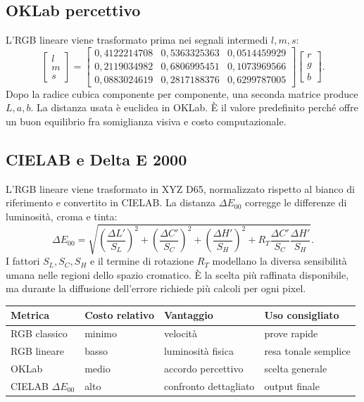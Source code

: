 \documentclass[11pt,a4paper]{article}
\begin{document}
\subsection{OKLab percettivo}
L'RGB lineare viene trasformato prima nei segnali intermedi $l,m,s$:
\[
\begin{bmatrix}l\\m\\s\end{bmatrix}=
\begin{bmatrix}
0{,}4122214708&0{,}5363325363&0{,}0514459929\\
0{,}2119034982&0{,}6806995451&0{,}1073969566\\
0{,}0883024619&0{,}2817188376&0{,}6299787005
\end{bmatrix}
\begin{bmatrix}r\\g\\b\end{bmatrix}.
\]
Dopo la radice cubica componente per componente, una seconda matrice produce $L,a,b$. La distanza usata è euclidea in OKLab. È il valore predefinito perché offre un buon equilibrio fra somiglianza visiva e costo computazionale.

\subsection{CIELAB e Delta E 2000}
L'RGB lineare viene trasformato in XYZ D65, normalizzato rispetto al bianco di riferimento e convertito in CIELAB. La distanza $\Delta E_{00}$ corregge le differenze di luminosità, croma e tinta:
\[
\Delta E_{00}=\sqrt{\left(\frac{\Delta L'}{S_L}\right)^2+\left(\frac{\Delta C'}{S_C}\right)^2+\left(\frac{\Delta H'}{S_H}\right)^2+R_T\frac{\Delta C'}{S_C}\frac{\Delta H'}{S_H}}.
\]
I fattori $S_L,S_C,S_H$ e il termine di rotazione $R_T$ modellano la diversa sensibilità umana nelle regioni dello spazio cromatico. È la scelta più raffinata disponibile, ma durante la diffusione dell'errore richiede più calcoli per ogni pixel.

\begin{center}\small
\begin{tabularx}{\textwidth}{@{}P{35mm}P{28mm}LL@{}}\toprule
Metrica & Costo relativo & Vantaggio & Uso consigliato \\\midrule
RGB classico & minimo & velocità & prove rapide \\
RGB lineare & basso & luminosità fisica & resa tonale semplice \\
OKLab & medio & accordo percettivo & scelta generale \\
CIELAB $\Delta E_{00}$ & alto & confronto dettagliato & output finale \\\bottomrule
\end{tabularx}
\end{center}
\end{document}
